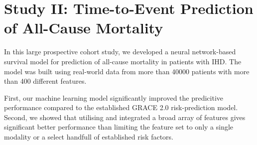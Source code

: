 \chapter{Study II: Time-to-Event Prediction of All-Cause Mortality}
\label{chap:study2-outline}


In this large prospective cohort study,
we developed a neural network-based survival model
for prediction of all-cause mortality in patients with \ac{IHD}.
The model was built using real-world data from more than \num{40000} patients
with more than \num{400} different features.


First, our machine learning model significantly improved the predicitive
performance compared to the established \ac{GRACE} 2.0 risk-prediction model.
Second, we showed that utilising and integrated a broad array of features
gives significant better performance than limiting the feature set to only
a single modality or a select handfull of established risk factors.


